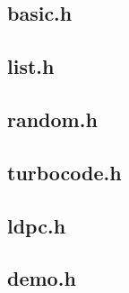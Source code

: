 \documentclass{article}
\begin{document}
\subsection{basic.h}


\subsection{list.h}


\subsection{random.h}


\subsection{turbocode.h}


\subsection{ldpc.h}


\subsection{demo.h}

\end{document}

